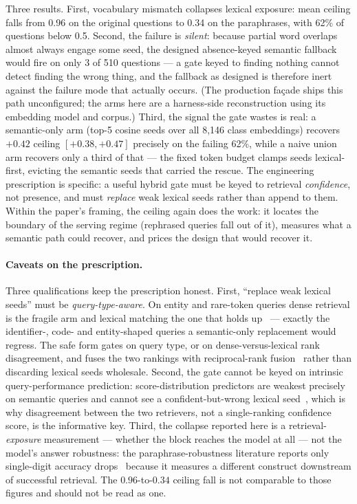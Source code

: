 \documentclass[10pt,twocolumn]{article}
\begin{document}
Three results. First, vocabulary mismatch collapses lexical exposure: mean ceiling falls from
0.96 on the original questions to 0.34 on the paraphrases, with 62\% of questions below 0.5.
Second, the failure is \emph{silent}: because partial word overlaps almost always engage some
seed, the designed absence-keyed semantic fallback would fire on only 3 of 510 questions ---
a gate keyed to finding nothing cannot detect finding the wrong thing, and the fallback as
designed is therefore inert against the failure mode that actually occurs. (The production
fa\c{c}ade ships this path unconfigured; the arms here are a harness-side reconstruction using
its embedding model and corpus.) Third, the signal the gate wastes is real: a semantic-only arm
(top-5 cosine seeds over all 8{,}146 class embeddings) recovers $+0.42$ ceiling
$[+0.38,+0.47]$ precisely on the failing 62\%, while a naive union arm recovers only a third of
that --- the fixed token budget clamps seeds lexical-first, evicting the semantic seeds that
carried the rescue. The engineering prescription is specific: a useful hybrid gate must be keyed
to retrieval \emph{confidence}, not presence, and must \emph{replace} weak lexical seeds rather
than append to them. Within the paper's framing, the ceiling again does the work: it locates
the boundary of the serving regime (rephrased queries fall out of it), measures what a semantic
path could recover, and prices the design that would recover it.

\paragraph{Caveats on the prescription.} Three qualifications keep the prescription honest. First, ``replace weak lexical seeds'' must be \emph{query-type-aware}. On entity and rare-token queries dense retrieval is the fragile arm and lexical matching the one that holds up~\cite{entityquestions2022} --- exactly the identifier-, code- and entity-shaped queries a semantic-only replacement would regress. The safe form gates on query type, or on dense-versus-lexical rank disagreement, and fuses the two rankings with reciprocal-rank fusion~\cite{rrf2009} rather than discarding lexical seeds wholesale. Second, the gate cannot be keyed on intrinsic query-performance prediction: score-distribution predictors are weakest precisely on semantic queries and cannot see a confident-but-wrong lexical seed~\cite{qppneural2023}, which is why disagreement between the two retrievers, not a single-ranking confidence score, is the informative key. Third, the collapse reported here is a retrieval-\emph{exposure} measurement --- whether the block reaches the model at all --- not the model's answer robustness: the paraphrase-robustness literature reports only single-digit accuracy drops~\cite{benchrobust2025} because it measures a different construct downstream of successful retrieval. The $0.96$-to-$0.34$ ceiling fall is not comparable to those figures and should not be read as one.
\end{document}
